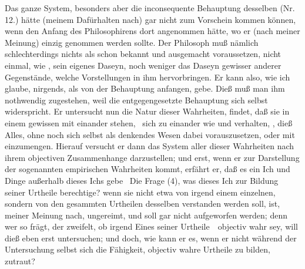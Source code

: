 \begin{aufza}
\begin{RWanm}
Das ganze  System, besonders aber die inconsequente Behauptung desselben  (Nr.\,12.) hätte (meinem Dafürhalten nach) gar nicht zum Vorschein kommen können, wenn  den Anfang des Philosophirens dort angenommen hätte, wo er (nach meiner Meinung) einzig genommen werden sollte. Der Philosoph muß nämlich schlechterdings nichts als schon bekannt und ausgemacht voraussetzen, nicht einmal, wie , sein eigenes Daseyn, noch weniger das Daseyn gewisser anderer Gegenstände, welche Vorstellungen in ihm hervorbringen. Er kann also, wie ich glaube, nirgends, als von der Behauptung anfangen,  gebe. Dieß muß man ihm nothwendig zugestehen, weil die entgegengesetzte Behauptung sich selbst widerspricht. Er untersucht nun die Natur dieser Wahrheiten, findet, daß sie in einem gewissen  mit einander stehen, \dh\ sich zu einander wie  und  verhalten, \usw , dieß Alles, ohne noch sich selbst als denkendes Wesen dabei vorauszusetzen, oder mit einzumengen. Hierauf versucht er dann das System aller dieser Wahrheiten nach ihrem objectiven Zusammenhange darzustellen; und erst, wenn er zur Darstellung der sogenannten empirischen Wahrheiten kommt, erfährt er, daß es ein Ich und Dinge außerhalb dieses Ichs gebe \usw\ Die Frage  (4), was dieses Ich zur Bildung seiner Urtheile berechtige? wenn sie nicht etwa von irgend einem einzelnen, sondern von den gesammten Urtheilen desselben verstanden werden soll, ist, meiner Meinung nach, ungereimt, und soll gar nicht aufgeworfen werden; denn wer so frägt, der zweifelt, ob irgend Eines seiner Urtheile~\ objectiv wahr sey, will dieß eben erst untersuchen; und doch, wie kann er es, wenn er nicht während der Untersuchung selbst sich die Fähigkeit, objectiv wahre Urtheile zu bilden, zutraut?
\end{RWanm}
\end{aufza}

